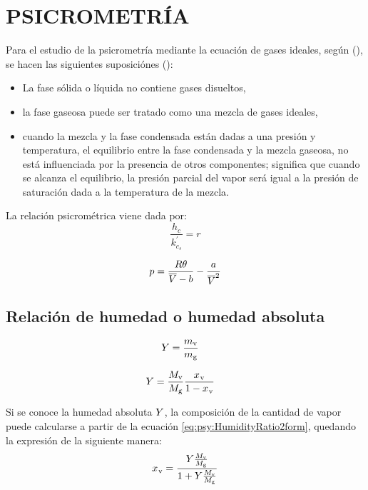 \section{PSICROMETR\'IA}

Para el estudio de la psicrometr\'ia mediante la ecuaci\'on de gases ideales, seg\'un (), se hacen las siguientes suposici\'ones ():

\begin{itemize}
  \item La fase s\'olida o l\'iquida no contiene gases disueltos,
  \item la fase gaseosa puede ser tratado como una mezcla de gases ideales,
  \item cuando la mezcla y la fase condensada est\'an dadas a una presi\'on y temperatura, el equilibrio entre la fase condensada y la mezcla gaseosa, no est\'a influenciada por la presencia de otros componentes; significa que cuando se alcanza el equilibrio, la presi\'on parcial del vapor ser\'a igual a la presi\'on de saturaci\'on dada a la temperatura de la mezcla.
\end{itemize}

La relaci\'on psicrométrica viene dada por:
\begin{equation}
  \frac{h_{c}}{k_{c_s}^{'}} = r
\end{equation}

\begin{equation}
  p = \frac{R \theta}{\overline V - b} - \frac{a}{\overline V^2}
\end{equation}

\subsection{Relación de humedad o humedad absoluta}
\begin{align}
  Y &= \frac{{m}_{{\text{v}}}}{{m}_{{\text{g}}}}
\end{align}

\begin{align}
  \label{eq:psy:HumidityRatio2form}
  Y &= \frac{M_{{\text{v}}}}{M_{{\text{g}}}} \frac{{x_{}}_{{\text{v}}}}{1-{{x_{}}_{{\text{v}}}}}
\end{align}

Si se conoce la humedad absoluta $Y$, la composición de la cantidad de vapor puede calcularse a partir de la ecuación \eqref{eq:psy:HumidityRatio2form}, quedando la expresión de la siguiente manera:
\begin{equation}
  {x_{}}_{{\text{v}}} = \frac{Y \frac{M_{{\text{v}}}}{M_{{\text{g}}}}}{1 + Y \frac{M_{{\text{v}}}}{M_{{\text{g}}}}}
\end{equation}


